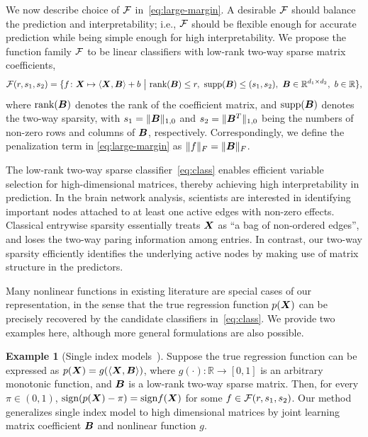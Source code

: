\documentclass[11pt]{article}
\theoremstyle{definition}
\newtheorem{example}{Example}
\def\sign{\textup{sign}}
\begin{document}
We now describe choice of $\mathcal{F}$ in~\eqref{eq:large-margin}. A desirable $\mathcal{F}$ should balance the prediction and interpretability; i.e., $\mathcal{F}$ should be flexible enough for accurate prediction while being simple enough for high interpretability. We propose the function family $\mathcal{F}$ to be linear classifiers with low-rank two-way sparse matrix coefficients,
\begin{align}\label{eq:class}
\tF(r,s_1,s_2)=\{f\colon \mX\mapsto \langle \mX, \mB \rangle +b \ \big|\ \text{rank}(\mB)\leq r, \ \text{supp}(\mB)\leq (s_1,s_2), \ \mB\in\mathbb{R}^{d_1\times d_2},\ b\in\mathbb{R}\},
\end{align}
where $\text{rank}(\bm B)$ denotes the rank of the coefficient matrix, and $\text{supp}(\bm B)$ denotes the two-way sparsity, with $s_1=\lVert\bm B\rVert_{1,0}$ and $s_2=\lVert\bm B^T\rVert_{1,0}$ being the numbers of non-zero rows and columns of $\bm B$, respectively. Correspondingly, we define the penalization term in \eqref{eq:large-margin} as $\lVert f\rVert_F = \lVert\bm B\rVert_F$. 

The low-rank two-way sparse classifier~\eqref{eq:class} enables efficient variable selection for high-dimensional matrices, thereby achieving high interpretability in prediction. In the brain network analysis, scientists are interested in identifying important nodes attached to at least one active edges with non-zero effects. Classical entrywise sparsity essentially treats $\bm X$ as ``a bag of non-ordered edges'', and loses the two-way paring information among entries. In contrast, our two-way sparsity efficiently identifies the underlying active nodes by making use of matrix structure in the predictors. 

Many nonlinear functions in existing literature are special cases of our representation, in the sense that the true regression function $p(\bm X)$ can be precisely recovered by the candidate classifiers in~\eqref{eq:class}. We provide two examples here, although more general formulations are also possible. 

\begin{example}[Single index models~\citep{alquier2013sparse,ganti2017learning}]\label{example:1}
Suppose the true regression function can be expressed as $p(\bm X)= g(\langle \bm X,\bm B\rangle)$, where $g(\cdot)\colon \mathbb{R}\to [0,1]$ is an arbitrary monotonic function, and $\bm B$ is a low-rank two-way sparse matrix. Then, for every $\pi\in(0,1)$, $\sign(p(\mX)-\pi)= \sign f(\mX)$ for some $f\in \mathcal{F}(r,s_1,s_2)$. Our method generalizes single index model to high dimensional matrices by joint learning matrix coefficient $\bm B$ and nonlinear function $g$. 
\end{example}
\end{document}
